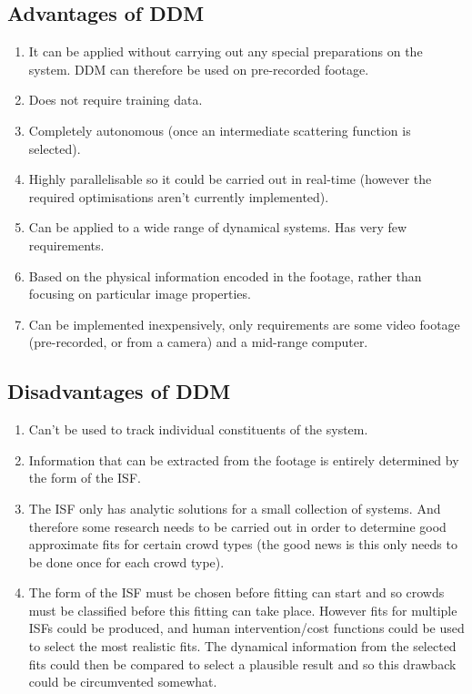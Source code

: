 \documentclass[11pt]{article}
\begin{document}
\subsection{Advantages of DDM}
\begin{enumerate}
\item It can be applied without carrying out any special preparations on the system. DDM can therefore be used on pre-recorded footage.
\item Does not require training data.
\item Completely autonomous (once an intermediate scattering function is selected).
\item Highly parallelisable so it could be carried out in real-time (however the required optimisations aren't currently implemented).
\item Can be applied to a wide range of dynamical systems. Has very few requirements.
\item Based on the physical information encoded in the footage, rather than focusing on particular image properties.
\item Can be implemented inexpensively, only requirements are some video footage (pre-recorded, or from a camera) and a mid-range computer.
\end{enumerate}

\subsection{Disadvantages of DDM}
\begin{enumerate}
\item Can't be used to track individual constituents of the system.
\item Information that can be extracted from the footage is entirely determined by the form of the ISF.
\item The ISF only has analytic solutions for a small collection of systems. And therefore some research needs to be carried out in order to determine good approximate fits for certain crowd types (the good news is this only needs to be done once for each crowd type).
\item The form of the ISF must be chosen before fitting can start and so crowds must be classified before this fitting can take place. However fits for multiple ISFs could be produced, and human intervention/cost functions could be used to select the most realistic fits. The dynamical information from the selected fits could then be compared to select a plausible result and so this drawback could be circumvented somewhat.
\end{enumerate}
 
\end{document}
